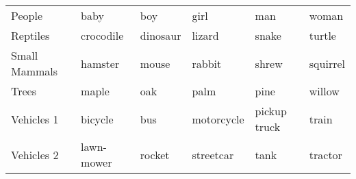 \documentclass[../thesis.tex]{subfiles}
\begin{document}
\begin{table}[H]
\begin{tabular}{@{}llllll@{}}
People                   & baby       & boy       & girl       & man          & woman         \\
Reptiles                 & crocodile  & dinosaur  & lizard     & snake        & turtle        \\
Small Mammals            & hamster    & mouse     & rabbit     & shrew        & squirrel      \\
Trees                    & maple      & oak       & palm       & pine         & willow        \\
Vehicles 1               & bicycle    & bus       & motorcycle & pickup truck & train         \\
Vehicles 2               & lawn-mower & rocket    & streetcar  & tank         & tractor       \\ \bottomrule
\end{tabular}
\end{table}
\end{document}

